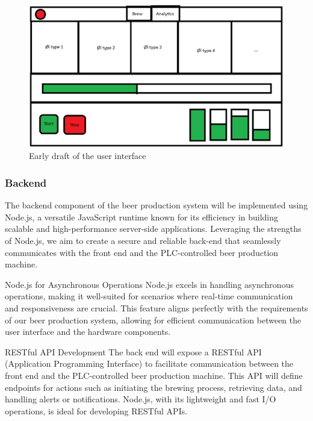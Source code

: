 \begin{center}
  \centering
  \begin{figure}[H]
      \includegraphics[width=1\textwidth]{img/frontend-draft.png}
      \caption{Early draft of the user interface}
      \label{fig:Frontend_draft}
  \end{figure}
\end{center}

\subsubsection{Backend}
The backend component of the beer production system will be implemented using Node.js, a versatile JavaScript runtime known for its efficiency in building scalable and high-performance server-side applications. Leveraging the strengths of Node.js, we aim to create a secure and reliable back-end that seamlessly communicates with the front end and the PLC-controlled beer production machine.

Node.js for Asynchronous Operations
Node.js excels in handling asynchronous operations, making it well-suited for scenarios where real-time communication and responsiveness are crucial. This feature aligns perfectly with the requirements of our beer production system, allowing for efficient communication between the user interface and the hardware components.

RESTful API Development
The back end will expose a RESTful API (Application Programming Interface) to facilitate communication between the front end and the PLC-controlled beer production machine. This API will define endpoints for actions such as initiating the brewing process, retrieving data, and handling alerts or notifications. Node.js, with its lightweight and fast I/O operations, is ideal for developing RESTful APIs.

